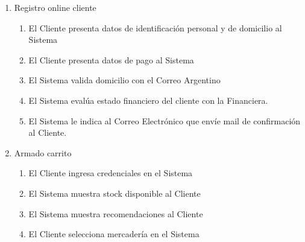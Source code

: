 \begin{enumerate}
  \item Registro online cliente
  \begin{enumerate}
    \item El Cliente presenta datos de identificación personal y de domicilio al Sistema \label{itm:f-cliente-datos-personal-sistema}
    \item El Cliente presenta datos de pago al Sistema \label{itm:f-cliente-datos-pago-sistema}
    \item El Sistema valida domicilio con el Correo Argentino \label{itm:f-sistema-valida-correoargentino}
    \item El Sistema evalúa estado financiero del cliente con la Financiera. \label{itm:f-sistema-evalua-financiera}
    \item El Sistema le indica al Correo Electrónico que envíe mail de confirmación al Cliente. \label{itm:f-sistema-confirmacion-correoelectronico}
  \end{enumerate}

  \item Armado carrito
  \begin{enumerate}
    \item El Cliente ingresa credenciales en el Sistema \label{itm:f-cliente-autentica-sistema}
    \item El Sistema muestra stock disponible al Cliente \label{itm:f-sistema-muestra-stock-cliente}
    \item El Sistema muestra recomendaciones al Cliente \label{itm:f-sistema-muestra-recomendaciones-cliente}
    \item El Cliente selecciona mercadería en el Sistema \label{itm:f-cliente-elige-mercaderia-sistema}
  \end{enumerate}


\end{enumerate}
